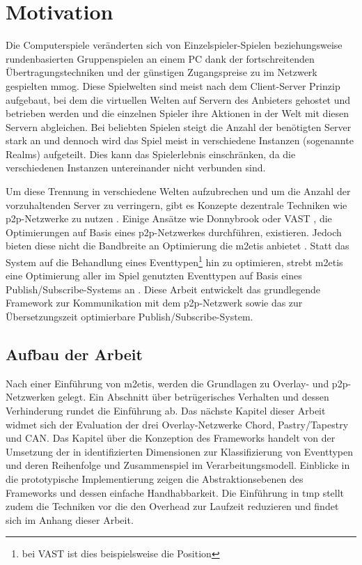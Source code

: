 \chapter{Motivation}
\label{chap:einleitung}
Die Computerspiele veränderten sich von Einzelspieler-Spielen beziehungsweise rundenbasierten Gruppenspielen an einem PC dank der fortschreitenden Übertragungstechniken und der günstigen Zugangspreise zu im Netzwerk gespielten \ac{mmog}. Diese Spielwelten sind meist nach dem Client-Server Prinzip aufgebaut, bei dem die virtuellen Welten auf Servern des Anbieters gehostet und betrieben werden und die einzelnen Spieler ihre Aktionen in der Welt mit diesen Servern abgleichen. Bei beliebten Spielen steigt die Anzahl der benötigten Server stark an und dennoch wird das Spiel meist in verschiedene Instanzen (sogenannte Realms) aufgeteilt. Dies kann das Spielerlebnis einschränken, da die verschiedenen Instanzen untereinander nicht verbunden sind.

Um diese Trennung in verschiedene Welten aufzubrechen und um die Anzahl der vorzuhaltenden Server zu verringern, gibt es Konzepte dezentrale Techniken wie \ac{p2p}-Netzwerke zu nutzen \cite{Knutsson2004Peertopeer, Triebel2008Peertopeer}. Einige Ansätze wie Donnybrook \cite{Bharambe2008Donnybrook} oder VAST \cite{Backhaus2007Voronoibased}, die Optimierungen auf Basis eines \ac{p2p}-Netzwerkes durchführen, existieren. Jedoch bieten diese nicht die Bandbreite an Optimierung die \ac{m2etis} anbietet \cite{Fischer2010Event}. Statt das System auf die Behandlung eines Eventtypen\footnote{bei VAST ist dies beispielsweise die Position} hin zu optimieren, strebt \ac{m2etis} eine Optimierung aller im Spiel genutzten Eventtypen auf Basis eines Publish/Subscribe-Systems an \cite{Fischer2010a}. Diese Arbeit entwickelt das grundlegende Framework zur Kommunikation mit dem \ac{p2p}-Netzwerk sowie das zur Übersetzungszeit optimierbare Publish/Subscribe-System.

\section*{Aufbau der Arbeit}
Nach einer Einführung von \ac{m2etis}, werden die Grundlagen zu Overlay- und p2p-Netzwerken gelegt. Ein Abschnitt über betrügerisches Verhalten und dessen Verhinderung rundet die Einführung ab. Das nächste Kapitel dieser Arbeit widmet sich der Evaluation der drei Overlay-Netzwerke Chord, Pastry/Tapestry und CAN. Das Kapitel über die Konzeption des Frameworks handelt von der Umsetzung der in \cite{Fischer2010Event} identifizierten Dimensionen zur Klassifizierung von Eventtypen und deren Reihenfolge und Zusammenspiel im Verarbeitungsmodell. Einblicke in die prototypische Implementierung zeigen die Abstraktionsebenen des Frameworks und dessen einfache Handhabbarkeit. Die Einführung in \ac{tmp} stellt zudem die Techniken vor die den Overhead zur Laufzeit reduzieren und findet sich im Anhang dieser Arbeit.
